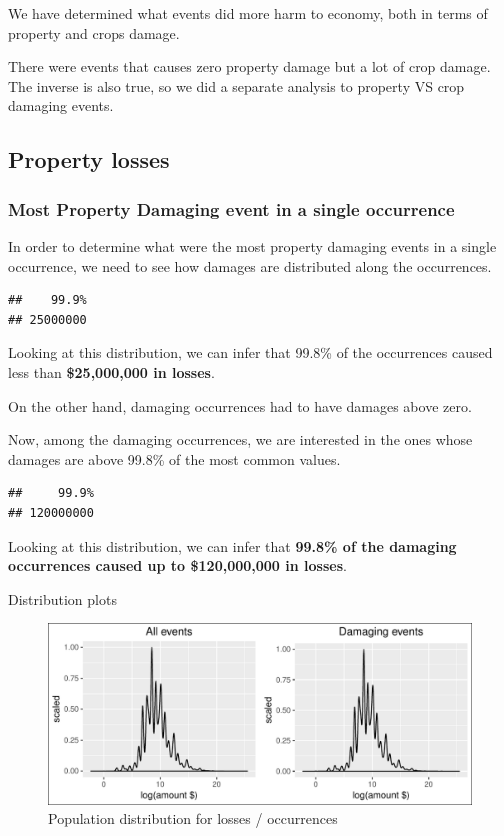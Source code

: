 \documentclass[]{article}
\begin{document}
We have determined what events did more harm to economy, both in terms
of property and crops damage.

There were events that causes zero property damage but a lot of crop
damage. The inverse is also true, so we did a separate analysis to
property VS crop damaging events.

\subsection{Property losses}\label{property-losses}

\subsubsection{Most Property Damaging event in a single
occurrence}\label{most-property-damaging-event-in-a-single-occurrence}

In order to determine what were the most property damaging events in a
single occurrence, we need to see how damages are distributed along the
occurrences.

\begin{verbatim}
##    99.9% 
## 25000000
\end{verbatim}

Looking at this distribution, we can infer that 99.8\% of the
occurrences caused less than \textbf{\$25,000,000 in losses}.

On the other hand, damaging occurrences had to have damages above zero.

Now, among the damaging occurrences, we are interested in the ones whose
damages are above 99.8\% of the most common values.

\begin{verbatim}
##     99.9% 
## 120000000
\end{verbatim}

Looking at this distribution, we can infer that \textbf{99.8\% of the
damaging occurrences caused up to \$120,000,000 in losses}.

Distribution plots

\begin{figure}[htbp]
\centering
\includegraphics{readme_files/figure-latex/crop-distribution-1.pdf}
\caption{Population distribution for losses / occurrences}
\end{figure}
\end{document}
